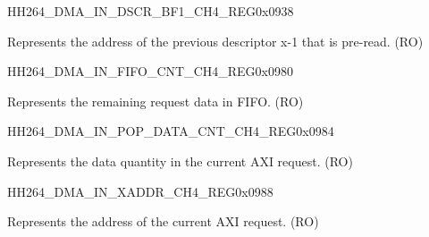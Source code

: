     
    \begin{register}{H}{H264\_DMA\_IN\_DSCR\_BF1\_CH4\_REG}{0x0938}\label{regdesc:H264DMAINDSCRBF1CH4REG}
    \regnewline%
    \begin{regdesc}\begin{reglist}
    \label{fielddesc:H264DMAINLINKDSCRBF1CH4}\item [H264\_DMA\_INLINK\_DSCR\_BF1\_CH4] Represents the address of the previous descriptor x-1 that is pre-read. (RO)
    \end{reglist}\end{regdesc}
    \end{register}
    
    \begin{register}{H}{H264\_DMA\_IN\_FIFO\_CNT\_CH4\_REG}{0x0980}\label{regdesc:H264DMAINFIFOCNTCH4REG}
    \regnewline%
    \begin{regdesc}\begin{reglist}
    \label{fielddesc:H264DMAINCMDFIFOINFIFOCNTCH4}\item [H264\_DMA\_IN\_CMDFIFO\_INFIFO\_CNT\_CH4] Represents the remaining request data in FIFO. (RO)
    \end{reglist}\end{regdesc}
    \end{register}
    
    
    \begin{register}{H}{H264\_DMA\_IN\_POP\_DATA\_CNT\_CH4\_REG}{0x0984}\label{regdesc:H264DMAINPOPDATACNTCH4REG}
    \regnewline%
    \begin{regdesc}\begin{reglist}
    \label{fielddesc:H264DMAINCMDFIFOPOPDATACNTCH4}\item [H264\_DMA\_IN\_CMDFIFO\_POP\_DATA\_CNT\_CH4] Represents the data quantity in the current AXI request. (RO)
    \end{reglist}\end{regdesc}
    \end{register}
    
    
    \begin{register}{H}{H264\_DMA\_IN\_XADDR\_CH4\_REG}{0x0988}\label{regdesc:H264DMAINXADDRCH4REG}
    \regnewline%
    \begin{regdesc}\begin{reglist}
    \label{fielddesc:H264DMAINCMDFIFOXADDRCH4}\item [H264\_DMA\_IN\_CMDFIFO\_XADDR\_CH4] Represents the address of the current AXI request. (RO)
    \end{reglist}\end{regdesc}
    \end{register}
    
